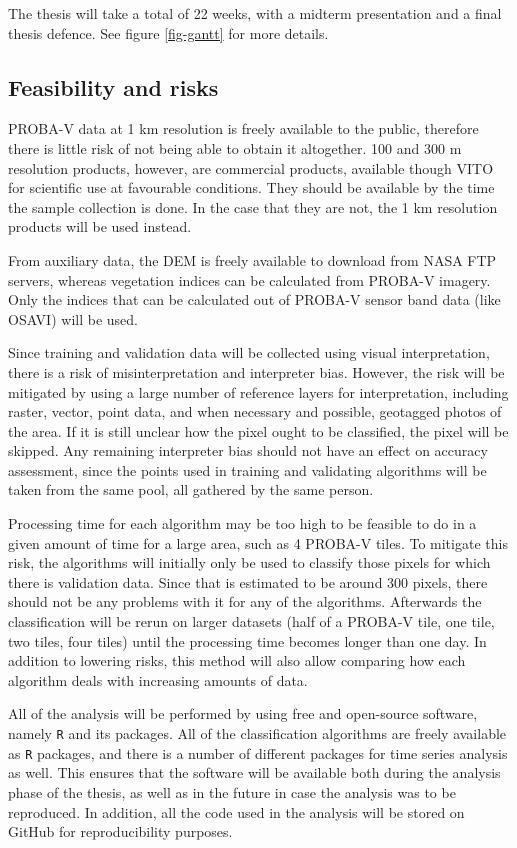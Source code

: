 \documentclass[a4paper,10pt]{article}
\begin{document}
The thesis will take a total of 22 weeks, with a midterm presentation and a final thesis defence. See figure \ref{fig-gantt} for more details.

\subsection{Feasibility and risks}

PROBA-V data at 1 km resolution is freely available to the public, therefore there is little risk of not being able to obtain it altogether. 100 and 300 m resolution products, however, are commercial products, available though VITO for scientific use at favourable conditions. They should be available by the time the sample collection is done. In the case that they are not, the 1 km resolution products will be used instead.

From auxiliary data, the DEM is freely available to download from NASA FTP servers, whereas vegetation indices can be calculated from PROBA-V imagery. Only the indices that can be calculated out of PROBA-V sensor band data (like OSAVI) will be used.

Since training and validation data will be collected using visual interpretation, there is a risk of misinterpretation and interpreter bias. However, the risk will be mitigated by using a large number of reference layers for interpretation, including raster, vector, point data, and when necessary and possible, geotagged photos of the area. If it is still unclear how the pixel ought to be classified, the pixel will be skipped. Any remaining interpreter bias should not have an effect on accuracy assessment, since the points used in training and validating algorithms will be taken from the same pool, all gathered by the same person.

Processing time for each algorithm may be too high to be feasible to do in a given amount of time for a large area, such as 4 PROBA-V tiles. To mitigate this risk, the algorithms will initially only be used to classify those pixels for which there is validation data. Since that is estimated to be around 300 pixels, there should not be any problems with it for any of the algorithms. Afterwards the classification will be rerun on larger datasets (half of a PROBA-V tile, one tile, two tiles, four tiles) until the processing time becomes longer than one day. In addition to lowering risks, this method will also allow comparing how each algorithm deals with increasing amounts of data.

All of the analysis will be performed by using free and open-source software, namely \texttt{R} and its packages. All of the classification algorithms are freely available as \texttt{R} packages, and there is a number of different packages for time series analysis as well. This ensures that the software will be available both during the analysis phase of the thesis, as well as in the future in case the analysis was to be reproduced. In addition, all the code used in the analysis will be stored on GitHub for reproducibility purposes.


\end{document}

